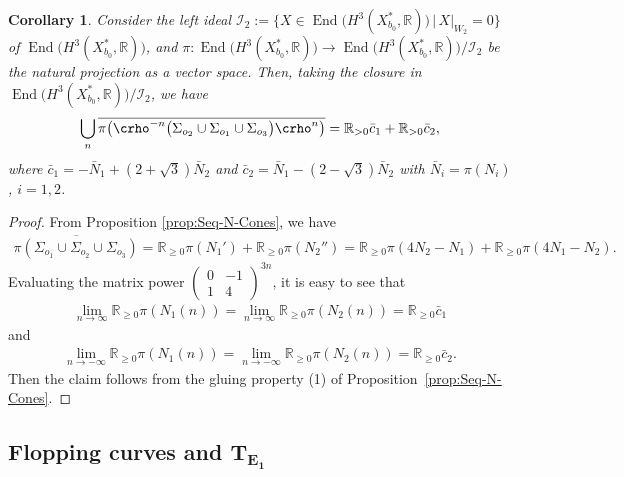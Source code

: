 \documentclass[pdftex]{sigma}
\numberwithin{equation}{section}
\newtheorem{Corollary}[Theorem]{Corollary}
\begin{document}
\begin{Corollary}\label{cor:XpartI} Consider the left ideal $\mathcal{I}_{2}:=\big\{ X\in\operatorname{End}\big(H^{3}(X_{b_{0}}^{*},\mathbb{R})\big)\,|\, X\vert_{W_{2}}=0\big\} $
of \linebreak $\operatorname{End}\big(H^{3}(X_{b_{0}}^{*},\mathbb{R})\big)$, and $\pi\colon\operatorname{End}\big(H^{3}(X_{b_{0}}^{*},\mathbb{R})\big)\to\operatorname{End}\big(H^{3}(X_{b_{0}}^{*},\mathbb{R})\big)/\mathcal{I}_{2}$
be the natural projection as a vector space. Then, taking the closure in $\operatorname{End}\big(H^{3}(X_{b_{0}}^{*},\mathbb{R})\big)/\mathcal{I}_{2}$, we have
\begin{gather*}
\bigcup_{n}\overline{\pi\big(\crho^{-n}\big(\Sigma_{o_{2}}\cup\Sigma_{o_{1}}\cup\Sigma_{o_{3}}\big)\crho^{n}\big)}=\mathbb{R}_{>0} \bar{c}_{1}+\mathbb{R}_{>0} \bar{c}_{2},
\end{gather*}
where $\bar{c}_{1}=-\bar{N}_{1}+(2+\sqrt{3})\bar{N}_{2}$ and $\bar{c}_{2}=\bar{N}_{1}-(2-\sqrt{3})\bar{N}_{2}$ with $\bar{N}_{i}=\pi(N_{i})$, $i=1,2$. \end{Corollary}
\begin{proof}
From Proposition \ref{prop:Seq-N-Cones}, we have
\begin{gather*}
\overline{\pi\left(\Sigma_{o_{1}}\cup\Sigma_{o_{2}}\cup\Sigma_{o_{3}}\right)} =\mathbb{R}_{\geq0}\pi(N_{1}')+\mathbb{R}_{\geq0}\pi(N_{2}'')
 =\mathbb{R}_{\geq0}\pi(4N_{2}-N_{1})+\mathbb{R}_{\geq0}\pi(4N_{1}-N_{2}).
\end{gather*}
Evaluating the matrix power $\left(\begin{smallmatrix}0 & -1\\
1 & 4\end{smallmatrix}\right)^{3n}$, it is easy to see that
\begin{gather*}
\lim_{n\to\infty}\mathbb{R}_{\geq0}\pi(N_{1}(n))=\lim_{n\to\infty}\mathbb{R}_{\geq0}\pi(N_{2}(n))=\mathbb{R}_{\geq0} \bar{c}_{1}
\end{gather*}
and
\begin{gather*}
\lim_{n\to-\infty}\mathbb{R}_{\geq0}\pi(N_{1}(n))=\lim_{n\to-\infty}\mathbb{R}_{\geq0}\pi(N_{2}(n))=\mathbb{R}_{\geq0} \bar{c}_{2}.
\end{gather*}
Then the claim follows from the gluing property (1) of Proposition~\ref{prop:Seq-N-Cones}.
\end{proof}

\subsection[Flopping curves and $T_{E_{1}}$]{Flopping curves and $\boldsymbol{T_{E_{1}}}$} \label{sub:TE1-Reye}
\end{document}
